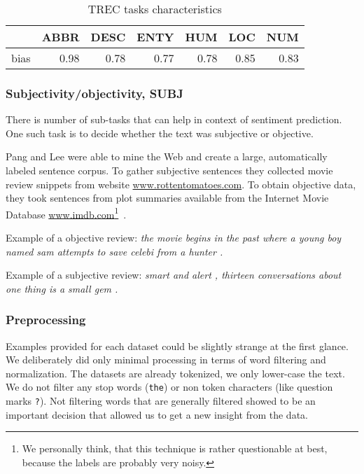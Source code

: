     \begin{table}[h]
    \begin{center}
    
    \begin{tabular}{lrrrrrr}
    \toprule
    {} &  ABBR &  DESC &  ENTY &   HUM &   LOC &   NUM \\
    \midrule
    bias &  0.98 &  0.78 &  0.77 &  0.78 &  0.85 &  0.83 \\
    \bottomrule
    \end{tabular}
    
    \caption[TREC tasks characteristics]{TREC tasks characteristics}
    \label{tab:trec:stats}
    \end{center}
    \end{table}

    \subsubsection{Subjectivity/objectivity, SUBJ}
    
    There is number of sub-tasks that can help in context of sentiment prediction.
    One such task is to decide whether the text was subjective or objective.
        
    Pang and Lee were able to mine the Web and create a large, automatically labeled sentence corpus. 
    To gather subjective sentences they collected movie review snippets from website  \url{www.rottentomatoes.com}.
    To obtain objective data, they took sentences from plot summaries available from the Internet Movie Database \url{www.imdb.com}\footnote{We personally think, that this technique is rather questionable at best, because the labels are probably very noisy.}~\cite{pang2004sentimental}.
    
    Example of a objective review:
    \emph{the movie begins in the past where a young boy named sam attempts to save celebi from a hunter .}

    Example of a subjective review:
    \emph{smart and alert , thirteen conversations about one thing is a small gem .}
    

    \subsubsection{Preprocessing} \label{sec:preprocessing}
    
    Examples provided for each dataset could be slightly strange at the first glance.
    We deliberately did only minimal processing in terms of word filtering and normalization.
    The datasets are already tokenized, we only lower-case the text.
    We do not filter any stop words (\texttt{the}) or non token characters (like question marks \texttt{?}). 
    Not filtering words that are generally filtered showed to be an important decision that allowed us to get a new insight from the data.
    
